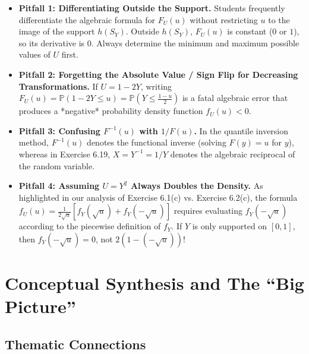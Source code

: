 \documentclass[11pt, letterpaper]{article}
\theoremstyle{definition}
\theoremstyle{remark}
\newcommand{\Prob}{\mathbb{P}}
\begin{document}
\begin{itemize}
    \item \textbf{Pitfall 1: Differentiating Outside the Support.} Students frequently differentiate the algebraic formula for $F_U(u)$ without restricting $u$ to the image of the support $h(S_Y)$. Outside $h(S_Y)$, $F_U(u)$ is constant ($0$ or $1$), so its derivative is $0$. Always determine the minimum and maximum possible values of $U$ first.
    \item \textbf{Pitfall 2: Forgetting the Absolute Value / Sign Flip for Decreasing Transformations.} If $U = 1 - 2Y$, writing $F_U(u) = \Prob(1 - 2Y \le u) = \Prob\left(Y \le \frac{1-u}{2}\right)$ is a fatal algebraic error that produces a *negative* probability density function $f_U(u) < 0$.
    \item \textbf{Pitfall 3: Confusing $F^{-1}(u)$ with $1/F(u)$.} In the quantile inversion method, $F^{-1}(u)$ denotes the functional inverse (solving $F(y) = u$ for $y$), whereas in Exercise 6.19, $X = Y^{-1} = 1/Y$ denotes the algebraic reciprocal of the random variable.
    \item \textbf{Pitfall 4: Assuming $U = Y^2$ Always Doubles the Density.} As highlighted in our analysis of Exercise 6.1(c) vs. Exercise 6.2(c), the formula $f_U(u) = \frac{1}{2\sqrt{u}}[f_Y(\sqrt{u}) + f_Y(-\sqrt{u})]$ requires evaluating $f_Y(-\sqrt{u})$ according to the piecewise definition of $f_Y$. If $Y$ is only supported on $[0, 1]$, then $f_Y(-\sqrt{u}) = 0$, not $2(1 - (-\sqrt{u}))$!
\end{itemize}

\newpage
\section{Conceptual Synthesis and The ``Big Picture''}

\subsection{Thematic Connections}
\end{document}
